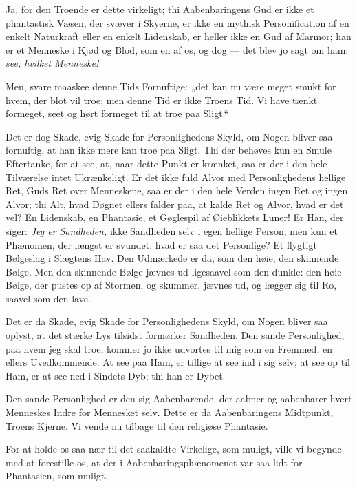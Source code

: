 \documentclass[12pt,a4paper]{book}
\newcommand{\apage}[1]{\marginnote{\footnotesize\textit{[#1]}}}
\begin{document}
Ja, for den Troende er dette virkeligt; thi Aabenbaringens Gud er ikke et
phantastisk Væsen, der svæver i Skyerne, er ikke en mythisk Personification af
en enkelt Naturkraft eller en enkelt Lidenskab, er heller ikke en Gud af
Marmor; han er et Menneske i Kjød og Blod, som en af os, og dog --- det blev
jo sagt om ham: \emph{see, hvilket Menneske!}
 \apage{17}

Men, svare maaskee denne Tids Fornuftige: „det kan nu være meget smukt for
hvem, der blot vil troe; men denne Tid er ikke Troens Tid. Vi have tænkt
formeget, seet og hørt formeget til at troe paa Sligt.“

Det er dog Skade, evig Skade for Personlighedens Skyld, om Nogen bliver saa
fornuftig, at han ikke mere kan troe paa Sligt. Thi der behøves kun en Smule
Eftertanke, for at see, at, naar dette Punkt er krænket, saa er der i den hele
Tilværelse intet Ukrænkeligt. Er det ikke fuld Alvor med Personlighedens
hellige Ret, Guds Ret over Menneskene, saa er der i den hele Verden ingen Ret
og ingen Alvor; thi Alt, hvad Døgnet ellers falder paa, at kalde Ret og Alvor,
hvad er det vel? En Lidenskab, en Phantasie, et Gøglespil af Øieblikkets
Luner! Er Han, der siger: \emph{Jeg er Sandheden,} ikke Sandheden selv i egen
hellige Person, men kun et Phænomen, der længst er svundet: hvad er saa det
Personlige? Et flygtigt Bølgeslag i Slægtens Hav. Den Udmærkede er da, som
den høie, den skinnende Bølge. Men den skinnende Bølge jævnes ud ligesaavel
som den dunkle: den høie Bølge, der pustes op af Stormen, og skummer, jævnes
ud, og lægger sig til Ro, saavel som den lave.

Det er da Skade, evig Skade for Personlighedens Skyld, om Nogen bliver saa
oplyst, at det stærke Lys tilsidst formørker Sandheden. Den sande
Personlighed, paa hvem jeg skal troe, kommer jo ikke udvortes til mig som en
Fremmed, en ellers Uvedkommende. At see paa Ham, er tillige at see ind i sig
selv; at see op til Ham, er at see ned i Sindets Dyb; thi han er Dybet.

Den sande Personlighed er den sig Aabenbarende, der aabner og aabenbarer
hvert Menneskes Indre for Mennesket selv. Dette er da Aabenbaringens
Midtpunkt, Troens Kjerne. Vi vende nu tilbage til den religiøse Phantasie.

For at holde os saa nær til det saakaldte Virkelige, som muligt, ville vi
begynde med at forestille os, at der i Aabenbaringsphænomenet var saa lidt for
Phantasien, som muligt.
 \apage{18}
\end{document}
